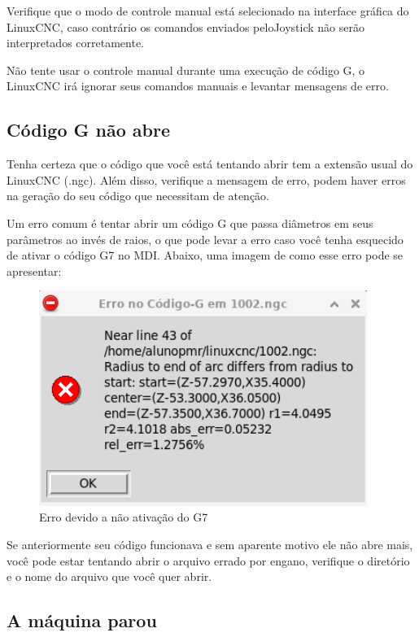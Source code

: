 \documentclass[twoside,a4paper]{refart}
\begin{document}
Verifique que o modo de controle manual está selecionado na interface gráfica do LinuxCNC, caso contrário os comandos enviados peloJoystick não serão interpretados corretamente.

\attention Não tente usar o controle manual durante uma execução de código G, o LinuxCNC irá ignorar seus comandos manuais e levantar mensagens de erro.

\subsection{Código G não abre}

Tenha certeza que o código que você está tentando abrir tem a extensão usual do LinuxCNC (.ngc). Além disso, verifique a mensagem de erro, podem haver erros na geração do seu código que necessitam de atenção.

Um erro comum é tentar abrir um código G que passa diâmetros em seus parâmetros ao invés de raios, o que pode levar a erro caso você tenha esquecido de ativar o código G7 no MDI. Abaixo, uma imagem de como esse erro pode se apresentar:

\begin{figure}
    \begin{center}
        \includegraphics[width=0.95\textwidth]{imagens/erro_g7.png}
    \end{center}
    \caption{Erro devido a não ativação do G7}\label{errog7}
\end{figure}

Se anteriormente seu código funcionava e sem aparente motivo ele não abre mais, você pode estar tentando abrir o arquivo errado por engano, verifique o diretório e o nome do arquivo que você quer abrir.

\subsection{A máquina parou}
\end{document}
